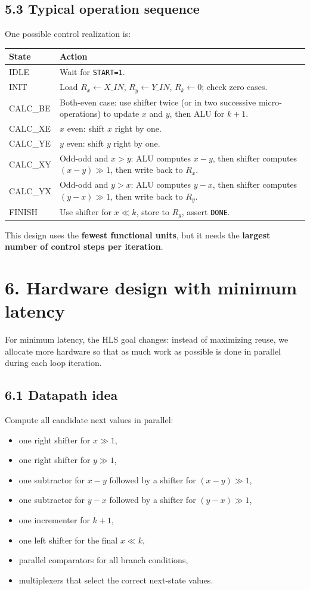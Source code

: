 \documentclass[11pt,a4paper]{article}
\begin{document}
\subsection*{5.3 Typical operation sequence}
One possible control realization is:
\begin{longtable}{p{2.3cm}p{10.5cm}}
\toprule
State & Action \\
\midrule
IDLE & Wait for \texttt{START=1}. \\
INIT & Load $R_x \leftarrow X\_IN$, $R_y \leftarrow Y\_IN$, $R_k \leftarrow 0$; check zero cases. \\
CALC\_BE & Both-even case: use shifter twice (or in two successive micro-operations) to update $x$ and $y$, then ALU for $k+1$. \\
CALC\_XE & $x$ even: shift $x$ right by one. \\
CALC\_YE & $y$ even: shift $y$ right by one. \\
CALC\_XY & Odd-odd and $x>y$: ALU computes $x-y$, then shifter computes $(x-y)\gg 1$, then write back to $R_x$. \\
CALC\_YX & Odd-odd and $y>x$: ALU computes $y-x$, then shifter computes $(y-x)\gg 1$, then write back to $R_y$. \\
FINISH & Use shifter for $x \ll k$, store to $R_g$, assert \texttt{DONE}. \\
\bottomrule
\end{longtable}

\noindent
This design uses the \textbf{fewest functional units}, but it needs the \textbf{largest number of control steps per iteration}.

\clearpage
\section*{6. Hardware design with minimum latency}
For minimum latency, the HLS goal changes: instead of maximizing reuse, we allocate more hardware so that as much work as possible is done in parallel during each loop iteration.

\subsection*{6.1 Datapath idea}
Compute all candidate next values in parallel:
\begin{itemize}
  \item one right shifter for $x \gg 1$,
  \item one right shifter for $y \gg 1$,
  \item one subtractor for $x-y$ followed by a shifter for $(x-y)\gg 1$,
  \item one subtractor for $y-x$ followed by a shifter for $(y-x)\gg 1$,
  \item one incrementer for $k+1$,
  \item one left shifter for the final $x \ll k$,
  \item parallel comparators for all branch conditions,
  \item multiplexers that select the correct next-state values.
\end{itemize}
\end{document}
